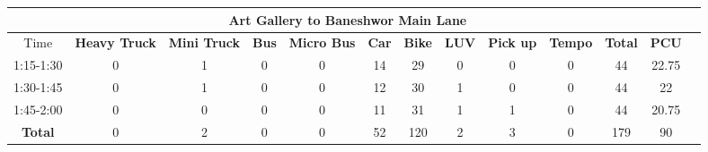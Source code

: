 \begin{landscape}
\begin{table}[h!]
\vspace{0.5cm}
\begin{tabular}{|c|c|c|c|c|c|c|c|c|c|c|c|c|}
    \hline
    \multicolumn{12}{|c|}{\textbf{Art Gallery to Baneshwor Main Lane}} \\
    \hline
        Time & \textbf{Heavy Truck} & \textbf{Mini Truck} & \textbf{Bus} & \textbf{Micro Bus} & \textbf{Car} & \textbf{Bike} & \textbf{LUV} & \textbf{Pick up} & \textbf{Tempo} & \textbf{\textbf{Total}} & \textbf{PCU} \\
    \hline
1:15-1:30	&0	&1	&0	&0	&14	&29	&0	&0	&0	&44	&22.75 \\ \hline
1:30-1:45	&0	&1	&0	&0	&12	&30	&1	&0	&0	&44	&22 \\ \hline
1:45-2:00	&0	&0	&0	&0	&11	&31	&1	&1	&0	&44	&20.75 \\ \hline
\textbf{Total}	&0	&2	&0	&0	&52	&120	&2	&3	&0	&179	&90 \\ \hline


\end{tabular}

\end{table}
\end{landscape}

